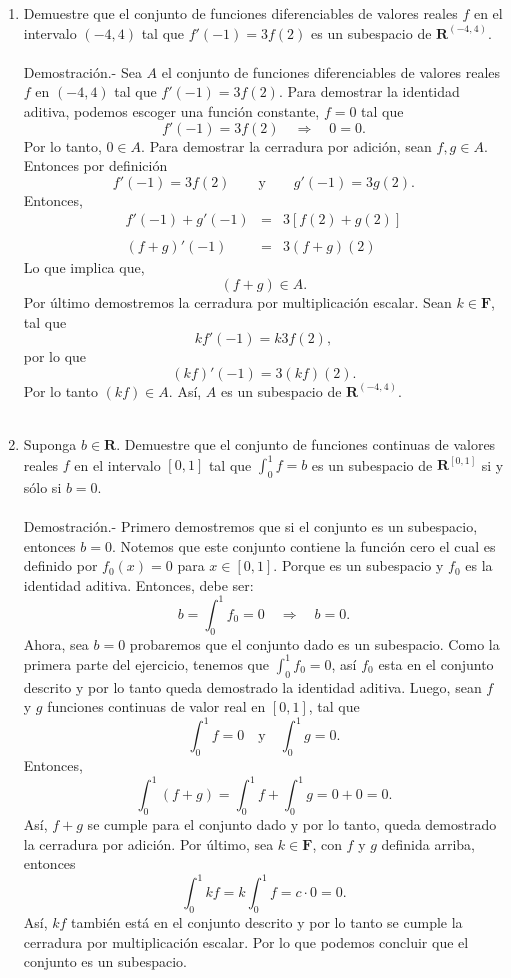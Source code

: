 \begin{enumerate}[\bfseries 1.]
    \item Demuestre que el conjunto de funciones diferenciables de valores reales $f$ en el intervalo $(-4,4)$ tal que $f'(-1)=3f(2)$ es un subespacio de $\textbf{R}^{(-4,4)}$.\\\\
	Demostración.-\; Sea $A$ el conjunto de funciones diferenciables de valores reales $f$ en $(-4,4)$ tal que $f'(-1)=3f(2)$. Para demostrar la identidad aditiva, podemos escoger una función constante, $f=0$ tal que 
	$$f'(-1)=3f(2)\quad \Rightarrow \quad 0=0.$$
	Por lo tanto, $0\in A$. Para demostrar la cerradura por adición, sean $f,g\in A$. Entonces por definición 
	$$f'(-1)=3f(2)\qquad \mbox{y}\qquad g'(-1)=3g(2).$$
	Entonces, 
	$$\begin{array}{rcl}
	    f'(-1)+g'(-1) &=& 3\left[f(2)+g(2)\right]\\\\
	    (f+g)'(-1) &=& 3(f+g)(2)
	\end{array}$$
	Lo que implica que,
	$$(f+g)\in A.$$
	Por último demostremos la cerradura por multiplicación escalar. Sean  $k\in \textbf{F}$, tal que 
	$$kf'(-1)=k3f(2),$$
	por lo que 
	$$(kf)'(-1)=3(kf)(2).$$
	Por lo tanto $(kf)\in A$. Así, $A$ es un subespacio de $\textbf{R}^{(-4,4)}$.\\\\

    \item Suponga $b\in \textbf{R}$. Demuestre que el conjunto de funciones continuas de valores reales $f$ en el intervalo $[0,1]$ tal que $\int_0^1 f = b$ es un subespacio de $\textbf{R}^{[0,1]}$ si y sólo si $b=0$.\\\\
	Demostración.-\; Primero demostremos que si el conjunto es un subespacio, entonces $b=0$. Notemos que este conjunto contiene la función cero el cual es definido por $f_0(x)=0$ para $x\in[0,1]$. Porque es un subespacio y $f_0$ es la identidad aditiva. Entonces, debe ser:
	$$b=\int_0^1 f_0=0\quad \Rightarrow \quad b=0.$$
	Ahora, sea $b=0$ probaremos que el conjunto dado es un subespacio. Como la primera parte del ejercicio, tenemos que $\int_0^1 f_0=0$, así $f_0$ esta en el conjunto descrito y por lo tanto queda demostrado la identidad aditiva. Luego, sean $f$ y $g$ funciones continuas de valor real en $[0,1]$, tal que 
	$$\int_0^1 f=0\quad \mbox{y}\quad \int_0^1 g = 0.$$
	Entonces,
	$$\int_0^1 (f+g)=\int_0^1 f + \int_0^1 g = 0+0=0.$$
	Así, $f+g$ se cumple para el conjunto dado y por lo tanto, queda demostrado la cerradura por adición. Por último, sea $k\in \textbf{F}$, con $f$ y $g$ definida arriba, entonces
	$$\int_0^1 kf = k\int_0^1 f = c\cdot 0 = 0.$$
	Así, $kf$ también está en el conjunto descrito y por lo tanto se cumple la cerradura por multiplicación escalar. Por lo que podemos concluir que el conjunto es un subespacio.\\\\


\end{enumerate}
